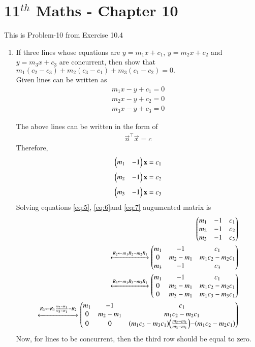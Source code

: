 \documentclass[12pt]{article}
\providecommand{\brak}[1]{\ensuremath{\left(#1\right)}}
\begin{document}
\section*{11$^{th}$ Maths - Chapter 10}
This is Problem-10 from Exercise 10.4
\begin{enumerate}
    \item If three lines whose equations are $y=m_1x+c_1$, $y=m_2x+c_2$ and $y=m_3x+c_3$ are concurrent, then show that $m_1(c_2-c_3)+m_2(c_3-c_1)+m_3(c_1-c_2) = 0.$\\
    \solution 
    Given lines can be written as \begin{align}
       m_1x-y+c_1=0
    \end{align}
    \begin{align}
        m_2x-y+c_2=0
    \end{align}
    \begin{align}
        m_3x-y+c_3=0
        \label{eq:3}
    \end{align}
    
    
   The above lines can be written in the form of \begin{align}
        \Vec{n}^{\top}\Vec{x} = c
    \end{align}
   Therefore,
		\begin{align}
       \begin{pmatrix}m_1&-1\end{pmatrix}\mathbf{x}=c_1
       \label{eq:5}
   \end{align} 
   \begin{align}
       \begin{pmatrix}m_2&-1\end{pmatrix}\mathbf{x}=c_2
       \label{eq:6}
   \end{align}
   \begin{align}
       \begin{pmatrix}m_3&-1\end{pmatrix}\mathbf{x}=c_3
       \label{eq:7}
   \end{align}
   Solving equations \eqref{eq:5}, \eqref{eq:6}and \eqref{eq:7}
		augumented matrix is
 \begin{align}
    \myvec{m_1&-1&c_1\\m_2&-1&c_2\\m_3&-1&c_3}\\
    \xleftrightarrow{R_2 \leftarrow m_1R_2-m_2R_1}
    \myvec{m_1&-1&c_1\\0&m_2-m_1&m_1c_2-m_2c_1\\m_3&-1&c_3}\\
    \xleftrightarrow{R_3 \leftarrow m_1R_3-m_3R_1}
    \myvec{m_1&-1&c_1\\0&m_2-m_1&m_1c_2-m_2c_1\\0&m_3-m_1&m_1c_3-m_3c_1}\\
    \xleftrightarrow{R_3 \leftarrow R_3\frac{m_2-m_1}{m_3-m_1}-R_2}
        \myvec{m_1&-1&c_1\\0&m_2-m_1&m_1c_2-m_2c_1\\0&0&$\brak{m_1c_3-m_3c_1}$$\brak{\frac{m_2-m_1}{m_3-m_1}}$-$\brak{m_1c_2-m_2c_1}$}
\end{align}
Now, for lines to be concurrent, then the third row should be equal to zero. \\


\end{enumerate}
\end{document}
